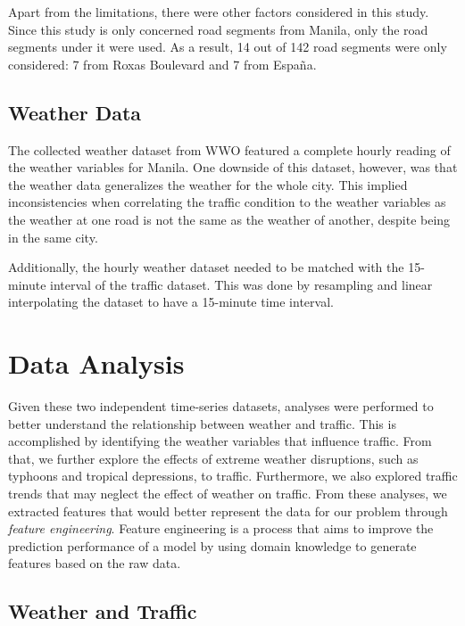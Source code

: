 Apart from the limitations, there were other factors considered in this study. Since this study is only concerned road segments from Manila, only the road segments under it were used. As a result, 14 out of 142 road segments were only considered: 7 from Roxas Boulevard and 7 from España.



\subsection{Weather Data}
The collected weather dataset from WWO featured a complete hourly reading of the weather variables for Manila. One downside of this dataset, however, was that the weather data generalizes the weather for the whole city. This implied inconsistencies when correlating the traffic condition to the weather variables as the weather at one road is not the same as the weather of another, despite being in the same city.

Additionally, the hourly weather dataset needed to be matched with the 15-minute interval of the traffic dataset. This was done by resampling and linear interpolating the dataset to have a 15-minute time interval.




\section{Data Analysis}
Given these two independent time-series datasets, analyses were performed to better understand the relationship between weather and traffic. This is accomplished by identifying the weather variables that influence traffic. From that, we further explore the effects of extreme weather disruptions, such as typhoons and tropical depressions, to traffic. Furthermore, we also explored traffic trends that may neglect the effect of weather on traffic. From these analyses, we extracted features that would better represent the data for our problem through \textit{feature engineering}. Feature engineering is a process that aims to improve the prediction performance of a model by using domain knowledge to generate features based on the raw data.


\subsection{Weather and Traffic}

